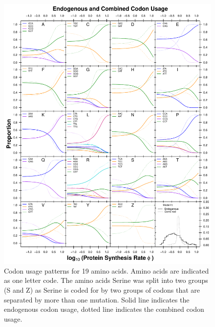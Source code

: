 \documentclass[fleqn,letterpaper]{article}
\begin{document}
\begin{figure}
     \centering
	\includegraphics[width=\textwidth]{img/CUB_full_main.pdf}
	\caption{Codon usage patterns for 19 amino acids. Amino acids are indicated as one letter code. 
	The amino acids Serine was split into two groups (S and Z) as Serine is coded for by two groups of codons that are separated by more than one mutation.
	Solid line indicates the endogenous codon usage, dotted line indicates the combined codon usage.}
	\label{fig:cub_full_main}
\end{figure}
\null
\vfill
\end{document}
